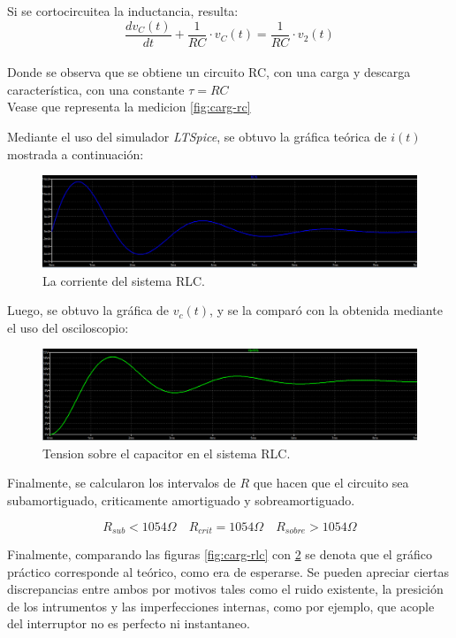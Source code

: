 \documentclass[a4paper]{article}
\begin{document}
Si se cortocircuitea la inductancia, resulta:
\begin{equation}
\frac{dv_{C}(t)}{dt}+\frac{1}{RC}\cdot v_{C}(t)=\frac{1}{RC}\cdot v_{2}(t)
\end{equation}\\
Donde se observa que se obtiene un circuito RC, con una carga y descarga característica, con una constante $\tau = RC$\\
Vease que representa la medicion \ref{fig:carg-rc}

Mediante el uso del simulador \textit{LTSpice}, se obtuvo la gráfica teórica de $i(t)$ mostrada a continuación:

\begin{figure}[H]
	\centering
	\includegraphics[scale=0.35]{carga-rlc-ic.PNG}
	\caption{La corriente del sistema RLC.}
	\label{fig:-corrrlc}
\end{figure}

Luego, se obtuvo la gráfica de $v_c(t)$, y se la comparó con la obtenida mediante el uso del osciloscopio:
\flushleft
\begin{figure}[H]
	\includegraphics[scale=0.35]{carga-rlc-vc.PNG}
	\caption{Tension sobre el capacitor en el sistema RLC.}
	\label{fig:-tenrlc}
\end{figure}

Finalmente, se calcularon los intervalos de $R$ que hacen que el circuito sea subamortiguado, criticamente amortiguado y sobreamortiguado.

\[R_{sub}<1054 \Omega \quad R_{crit}= 1054 \Omega \quad R_{sobre}>1054 \Omega\]

Finalmente, comparando las figuras \ref{fig:carg-rlc} con \ref{fig:-tenrlc} se denota que el gráfico práctico corresponde al teórico, como era de esperarse. Se pueden apreciar ciertas discrepancias entre ambos por motivos tales como el ruido existente, la presición de los intrumentos y las imperfecciones internas, como por ejemplo, que acople del interruptor no es perfecto ni instantaneo. 
\end{document}
